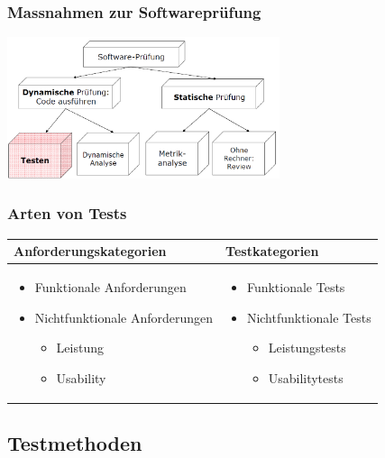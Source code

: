\begin{multicols}{2}
	\subsubsection{Massnahmen zur Softwareprüfung}
\includegraphics[width = 8cm]{images/massnahmenSoftwarepruefung}
	
	\subsubsection{Arten von Tests}
	\begin{minipage}{10cm}
\begin{tabular}{|p{5cm}|p{4cm}|}
	\hline
	\textbf{Anforderungskategorien} & \textbf{Testkategorien} \\ \hline
	\begin{itemize}
		\item Funktionale Anforderungen
		\item Nichtfunktionale Anforderungen
		\begin{itemize}
			\item Leistung
			\item Usability
		\end{itemize}
		\end{itemize} & 
		\begin{itemize}
		\item Funktionale Tests
		\item Nichtfunktionale Tests
		\begin{itemize}
			\item Leistungstests
			\item Usabilitytests
		\end{itemize}
	\end{itemize} \\ \hline
\end{tabular}
\end{minipage}
\end{multicols}

\subsection{Testmethoden}
